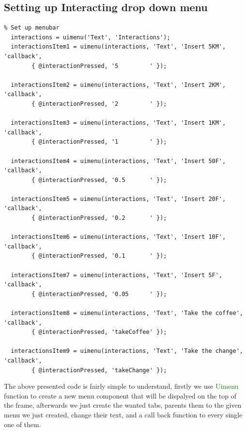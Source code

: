\documentclass[a4paper, 10pt]{article}
\begin{document}
		\subsection{Setting up Interacting drop down menu}
		\begin{lstlisting}
% Set up menubar
  interactions = uimenu('Text', 'Interactions');
  interactionsItem1 = uimenu(interactions, 'Text', 'Insert 5KM', 'callback',
		{ @interactionPressed, '5         ' });

  interactionsItem2 = uimenu(interactions, 'Text', 'Insert 2KM', 'callback',
		{ @interactionPressed, '2         ' });

  interactionsItem3 = uimenu(interactions, 'Text', 'Insert 1KM', 'callback',
		{ @interactionPressed, '1         ' });

  interactionsItem4 = uimenu(interactions, 'Text', 'Insert 50F', 'callback',
		{ @interactionPressed, '0.5       ' });

  interactionsItem5 = uimenu(interactions, 'Text', 'Insert 20F', 'callback',
		{ @interactionPressed, '0.2       ' });

  interactionsItem6 = uimenu(interactions, 'Text', 'Insert 10F', 'callback',
		{ @interactionPressed, '0.1       ' });

  interactionsItem7 = uimenu(interactions, 'Text', 'Insert 5F', 'callback',
		{ @interactionPressed, '0.05      ' });

  interactionsItem8 = uimenu(interactions, 'Text', 'Take the coffee', 'callback',
		{ @interactionPressed, 'takeCoffee' });

  interactionsItem9 = uimenu(interactions, 'Text', 'Take the change', 'callback',
		{ @interactionPressed, 'takeChange' });
		\end{lstlisting}
		
			\noindent The above presented code is fairly simple to understand, firstly we use \textcolor{green}{Uimenu} function to create a new menu component that will be dispalyed on the top of the frame, afterwards we just create the wanted tabs, parents
			them to the given menu we just created, change their text, and a call back function to every single one of them.

			\pagebreak
\end{document}
